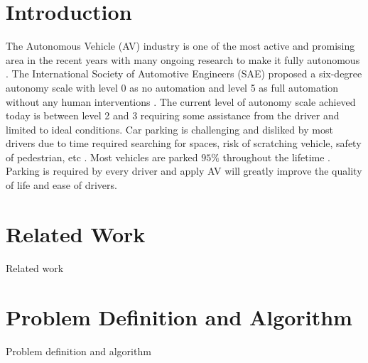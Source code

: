 \documentclass{svproc}
\begin{document}
\section{Introduction}
%
%
The Autonomous Vehicle (AV) industry is one of the most active and promising area in the recent years with many ongoing research to make it fully autonomous \cite{talavera2021autonomous}. The International Society of Automotive Engineers (SAE) proposed a six-degree autonomy scale with level 0 as no automation and level 5 as full automation without any human interventions \cite{stoma2021future}. The current level of autonomy scale achieved today is between level 2 and 3 requiring some assistance from the driver and limited to ideal conditions.
%
Car parking is challenging and disliked by most drivers due to time required searching for spaces, risk of scratching vehicle, safety of pedestrian, etc \cite{baburaj2021smart}\cite{bosch_global_2022}.
%
Most vehicles are parked $95\%$ throughout the lifetime \cite{choi2019self}. Parking is required by every driver and apply AV will greatly improve the quality of life and ease of drivers.



\section{Related Work}
Related work

\section{Problem Definition and Algorithm}
Problem definition and algorithm
\end{document}

